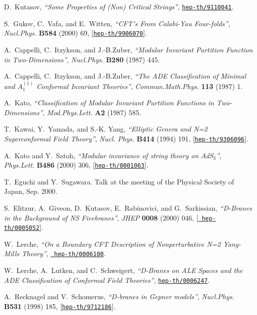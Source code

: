 \documentclass[a4paper,12pt]{article}
\numberwithin{equation}{section}
\begin{document}
\begin{thebibliography}{10}
D.~Kutasov, {\it ``{Some Properties of (Non) Critical Strings}''},
  \href{http://xxx.lanl.gov/abs/hep-th/9110041}{{\tt hep-th/9110041}}.

S.~Gukov, C.~Vafa, and E.~Witten, {\it ``{CFT's From Calabi-Yau Four-folds}''},
   {\em Nucl.Phys.} {\bf B584} (2000) 69,
  [\href{http://xxx.lanl.gov/abs/hep-th/9906070}{{\tt hep-th/9906070}}].

A.~Cappelli, C.~Itzykson, and J.-B.Zuber, {\it ``{Modular Invariant Partition
  Function in Two-Dimensions}''},  {\em Nucl.Phys.} {\bf B280} (1987) 445.

A.~Cappelli, C.~Itzykson, and J.-B.Zuber, {\it ``{The ADE Classification of
  Minimal and $A_1^{(1)}$ Conformal Invariant Theories}''},  {\em
  Commun.Math.Phys.} {\bf 113} (1987) 1.

A.~Kato, {\it ``{Classification of Modular Invariant Partition Functions in
  Two-Dimensions}''},  {\em Mod.Phys.Lett.} {\bf A2} (1987) 585.

T.~Kawai, Y.~Yamada, and S.-K. Yang, {\it ``{Elliptic Genera and N=2
  Superconformal Field Theory}''},  {\em Nucl. Phys.} {\bf B414} (1994) 191,
  [\href{http://xxx.lanl.gov/abs/hep-th/9306096}{{\tt hep-th/9306096}}].

A.~Kato and Y.~Satoh, {\it ``{Modular invariance of string theory on
  AdS${}_3$}''},  {\em Phys.Lett.} {\bf B486} (2000) 306,
  [\href{http://xxx.lanl.gov/abs/hep-th/0001063}{{\tt hep-th/0001063}}].

T.~Eguchi and Y.~Sugawara.
\newblock Talk at the meeting of the Physical Society of Japan, Sep. 2000.

S.~Elitzur, A.~Giveon, D.~Kutasov, E.~Rabinovici, and G.~Sarkissian, {\it
  ``{D-Branes in the Background of NS Fivebranes}''},  {\em JHEP} {\bf 0008}
  (2000) 046, [\href{http://xxx.lanl.gov/abs/hep-th/0005052}{{\tt
  hep-th/0005052}}].

W.~Lerche, {\it ``{On a Boundary CFT Description of Nonperturbative N=2
  Yang-Mills Theory}''},  \href{http://xxx.lanl.gov/abs/hep-th/0006100}{{\tt
  hep-th/0006100}}.

W.~Lerche, A.~Lutken, and C.~Schweigert, {\it ``{D-Branes on ALE Spaces and the
  ADE Classification of Conformal Field Theories}''},
  \href{http://xxx.lanl.gov/abs/hep-th/0006247}{{\tt hep-th/0006247}}.

A.~Recknagel and V.~Schomerus, {\it ``{D-branes in Gepner models}''},  {\em
  Nucl.Phys.} {\bf B531} (1998) 185,
  [\href{http://xxx.lanl.gov/abs/hep-th/9712186}{{\tt hep-th/9712186}}].


\end{thebibliography}
\end{document}
